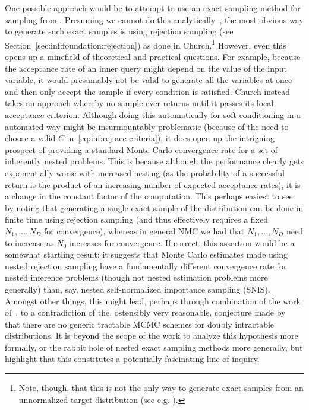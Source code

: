 One possible approach would be to attempt to
use an exact sampling method for sampling from \conditional. Presuming we cannot
do this analytically~\citep{cornish2017efficient}, the most obvious way to generate such exact
samples is using rejection sampling (see Section~\ref{sec:inf:foundation:rejection}) as done in
Church.\footnote{Note, though, that this
is not the only way to generate exact samples from an unnormalized target distribution (see e.g. \citep{craiu2011perfection}).}
However, even this opens up a minefield of theoretical
and practical questions.  For example, because the acceptance rate of an inner query might depend on the
value of the input variable, it would presumably not be valid to generate all the variables at once
and then only accept the sample if every condition is satisfied.
Church instead takes an approach whereby no sample ever returns until it passes its local acceptance criterion.
Although doing this automatically for soft conditioning in a automated way might be insurmountably problematic (because of the
need to choose a valid $C$ in~\eqref{eq:inf:rej-acc-criteria}), it does open up the intriguing prospect
of providing a standard Monte Carlo convergence rate for a set of inherently nested problems.  This is because although the performance clearly
gets exponentially worse with increased nesting (as the probability of a successful return is the
product of an increasing number of expected acceptance rates), it is a change in the constant factor of the
computation.  This perhaps easiest to see by noting that 
generating a single exact sample of the distribution
can be done in finite time using rejection sampling (and thus effectively requires a fixed $N_1,\dots,N_D$ for
convergence), whereas in general NMC we had that $N_1,\dots,N_D$ need to increase as $N_0$ increases for convergence.
If correct, this assertion would be a somewhat startling result: it suggests that Monte Carlo 
estimates made using nested rejection sampling have a fundamentally different
convergence rate for nested inference problems (though not nested estimation problems more generally) than, say,
nested self-normalized importance sampling (SNIS).  Amongst other things, this might lead, 
perhaps through combination of 
the work of~\cite{moller2006efficient}, to a contradiction of the, ostensibly very reasonable, conjecture
made by~\cite{murray2004bayesian} that there are no generic tractable MCMC schemes for doubly intractable distributions.
It is beyond the scope of the work to analyze this hypothesis more formally, or the rabbit hole of
nested exact sampling methods more generally, but highlight that this constitutes a potentially fascinating line of inquiry.

